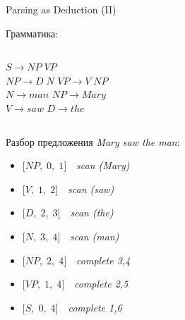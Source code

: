 \documentclass{beamer}
\begin{document}
\begin{frame}{Parsing as Deduction (II)}
\begin{small}
Грамматика:\\
\bigskip
\begin{columns}[c,onlytextwidth]
    $S \to NP \; VP$\\
    $NP \to D \; N$
    $VP \to V \; NP$\\
    $N \to man$
    $NP \to Mary$\\
    $V \to saw$
    $D \to the$
\end{columns}

\bigskip
Разбор предложения \textit{Mary saw the man}:\\
\medskip
\begin{itemize}
	\item[] $\lbrack NP, \; 0, \; 1 \rbrack$~~\textit{scan (Mary)}
	\item[] $\lbrack V, \; 1, \; 2 \rbrack$~~\textit{scan (saw)}
	\item[] $\lbrack D, \; 2, \; 3 \rbrack$~~\textit{scan (the)}
	\item[] $\lbrack N, \; 3, \; 4 \rbrack$~~\textit{scan (man)}
	\item[] $\lbrack NP, \; 2, \; 4 \rbrack$~~\textit{complete 3,4}
	\item[] $\lbrack VP, \; 1, \; 4 \rbrack$~~\textit{complete 2,5}
	\item[] $\lbrack S, \; 0, \; 4 \rbrack$~~\textit{complete 1,6}
\end{itemize}
\end{small}
\end{frame}
\end{document}
